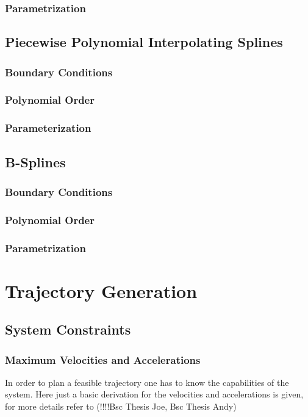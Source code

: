 \subsubsection{Parametrization}
\subsection{Piecewise Polynomial Interpolating Splines}
\subsubsection{Boundary Conditions}
\subsubsection{Polynomial Order}
\subsubsection{Parameterization}
\subsection{B-Splines}
\subsubsection{Boundary Conditions}
\subsubsection{Polynomial Order}
\subsubsection{Parametrization}

\section{Trajectory Generation}
\label{sec:trajectoryGeneration}
\subsection{System Constraints}
\subsubsection{Maximum Velocities and Accelerations}
In order to plan a feasible trajectory one has to know the capabilities of the system. Here just a basic derivation for the velocities and accelerations is given, for more details refer to (!!!!Bsc Thesis Joe, Bsc Thesis Andy)\\

